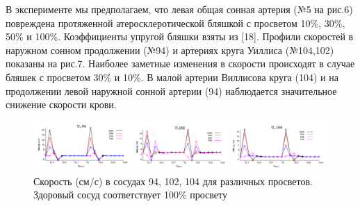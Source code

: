В эксперименте мы предполагаем, что левая общая сонная артерия (№5 на рис.6) 
повреждена протяженной атеросклеротической бляшкой с просветом 10\%, 30\%, 50\% и 
100\%. Коэффициенты упругой бляшки взяты из [18]. Профили скоростей в наружном 
сонном продолжении (№94) и артериях круга Уиллиса (№104,102) показаны на рис.7. 
Наиболее заметные изменения в скорости происходят в случае бляшек с просветом 30\% и 
10\%. В малой артерии Виллисова круга (104) и на продолжении левой наружной сонной 
артерии (94) наблюдается значительное снижение скорости крови.

\begin{figure}[h]
\centering
\includegraphics[width=0.9\linewidth]{grap.png}
\caption{Скорость (см/с) в сосудах 94, 102, 104 для различных просветов. Здоровый сосуд
соответствует 100\% просвету}
\label{fig:mpr}
\end{figure}
